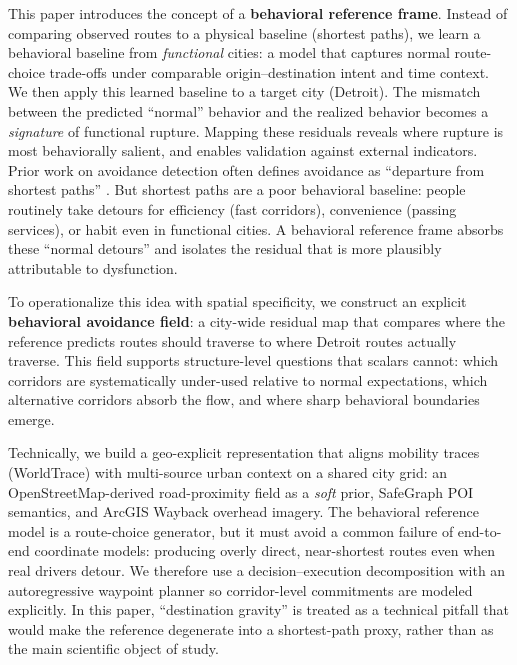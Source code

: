 This paper introduces the concept of a \textbf{behavioral reference frame}. Instead of comparing observed routes to a physical baseline (shortest paths), we learn a behavioral baseline from \emph{functional} cities: a model that captures normal route-choice trade-offs under comparable origin--destination intent and time context. We then apply this learned baseline to a target city (Detroit). The mismatch between the predicted ``normal'' behavior and the realized behavior becomes a \emph{signature} of functional rupture. Mapping these residuals reveals where rupture is most behaviorally salient, and enables validation against external indicators. Prior work on avoidance detection often defines avoidance as ``departure from shortest paths'' \citep{eftelioglu2018avoidance}. But shortest paths are a poor behavioral baseline: people routinely take detours for efficiency (fast corridors), convenience (passing services), or habit even in functional cities. A behavioral reference frame absorbs these ``normal detours'' and isolates the residual that is more plausibly attributable to dysfunction.

To operationalize this idea with spatial specificity, we construct an explicit \textbf{behavioral avoidance field}: a city-wide residual map that compares where the reference predicts routes should traverse to where Detroit routes actually traverse. This field supports structure-level questions that scalars cannot: which corridors are systematically under-used relative to normal expectations, which alternative corridors absorb the flow, and where sharp behavioral boundaries emerge.

Technically, we build a geo-explicit representation that aligns mobility traces (WorldTrace) with multi-source urban context on a shared city grid: an OpenStreetMap-derived road-proximity field as a \emph{soft} prior, SafeGraph POI semantics, and ArcGIS Wayback overhead imagery. The behavioral reference model is a route-choice generator, but it must avoid a common failure of end-to-end coordinate models: producing overly direct, near-shortest routes even when real drivers detour. We therefore use a decision--execution decomposition with an autoregressive waypoint planner so corridor-level commitments are modeled explicitly. In this paper, ``destination gravity'' is treated as a technical pitfall that would make the reference degenerate into a shortest-path proxy, rather than as the main scientific object of study.

